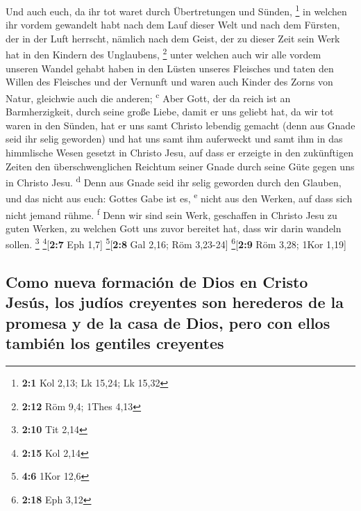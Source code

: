  Und auch euch, da ihr tot waret durch Übertretungen und
Sünden, \footnote{\textbf{2:1} Kol 2,13; Lk 15,24; Lk 15,32}
 in welchen ihr vordem gewandelt habt nach dem Lauf dieser
Welt und nach dem Fürsten, der in der Luft herrscht, nämlich nach dem
Geist, der zu dieser Zeit sein Werk hat in den Kindern des Unglaubens,
\footnote{\textbf{2:12} Röm 9,4; 1Thes 4,13}  unter
welchen auch wir alle vordem unseren Wandel gehabt haben in den Lüsten
unseres Fleisches und taten den Willen des Fleisches und der Vernunft
und waren auch Kinder des Zorns von Natur, gleichwie auch die anderen;
\textsuperscript{c}  Aber Gott, der da reich ist an
Barmherzigkeit, durch seine große Liebe, damit er uns geliebt hat,
 da wir tot waren in den Sünden, hat er uns samt Christo
lebendig gemacht (denn aus Gnade seid ihr selig geworden) 
und hat uns samt ihm auferweckt und samt ihm in das himmlische Wesen
gesetzt in Christo Jesu,  auf dass er erzeigte in den
zukünftigen Zeiten den überschwenglichen Reichtum seiner Gnade durch
seine Güte gegen uns in Christo Jesu. \textsuperscript{d} 
Denn aus Gnade seid ihr selig geworden durch den Glauben, und das nicht
aus euch: Gottes Gabe ist es, \textsuperscript{e}  nicht
aus den Werken, auf dass sich nicht jemand rühme. \textsuperscript{f}
 Denn wir sind sein Werk, geschaffen in Christo Jesu zu
guten Werken, zu welchen Gott uns zuvor bereitet hat, dass wir darin
wandeln sollen. \footnote{\textbf{2:10} Tit 2,14}
\footnote{\textbf{2:15} Kol 2,14}{[}\textbf{2:7} Eph 1,7{]}
\footnote{\textbf{4:6} 1Kor 12,6}{[}\textbf{2:8} Gal 2,16; Röm
3,23-24{]} \footnote{\textbf{2:18} Eph 3,12}{[}\textbf{2:9} Röm 3,28;
1Kor 1,19{]}

\hypertarget{como-nueva-formaciuxf3n-de-dios-en-cristo-jesuxfas-los-juduxedos-creyentes-son-herederos-de-la-promesa-y-de-la-casa-de-dios-pero-con-ellos-tambiuxe9n-los-gentiles-creyentes}{%
\subsection{Como nueva formación de Dios en Cristo Jesús, los judíos
creyentes son herederos de la promesa y de la casa de Dios, pero con
ellos también los gentiles
creyentes}\label{como-nueva-formaciuxf3n-de-dios-en-cristo-jesuxfas-los-juduxedos-creyentes-son-herederos-de-la-promesa-y-de-la-casa-de-dios-pero-con-ellos-tambiuxe9n-los-gentiles-creyentes}}

